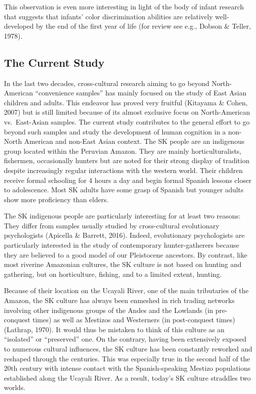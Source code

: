\documentclass[man]{apa6}
\theoremstyle{definition}
\theoremstyle{definition}
\theoremstyle{definition}
\theoremstyle{remark}
\begin{document}
This observation is even more interesting in light of the body of infant
research that suggests that infants' color discrimination abilities are
relatively well-developed by the end of the first year of life (for
review see e.g., Dobson \& Teller, 1978).

\subsection{The Current Study}\label{the-current-study}

In the last two decades, cross-cultural research aiming to go beyond
North-American \enquote{convenience samples} has mainly focused on the
study of East Asian children and adults. This endeavor has proved very
fruitful (Kitayama \& Cohen, 2007) but is still limited because of its
almost exclusive focus on North-American vs.~East-Asian samples. The
current study contributes to the general effort to go beyond such
samples and study the development of human cognition in a non-North
American and non-East Asian context. The SK people are an indigenous
group located within the Peruvian Amazon. They are mainly
horticulturalists, fishermen, occasionally hunters but are noted for
their strong display of tradition despite increasingly regular
interactions with the western world. Their children receive formal
schooling for 4 hours a day and begin formal Spanish lessons closer to
adolescence. Most SK adults have some grasp of Spanish but younger
adults show more proficiency than elders.

The SK indigenous people are particularly interesting for at least two
reasons: They differ from samples usually studied by cross-cultural
evolutionary psychologists (Apicella \& Barrett, 2016). Indeed,
evolutionary psychologists are particularly interested in the study of
contemporary hunter-gatherers because they are believed to a good model
of our Pleistocene ancestors. By contrast, like most riverine Amazonian
cultures, the SK culture is not based on hunting and gathering, but on
horticulture, fishing, and to a limited extent, hunting.

Because of their location on the Ucayali River, one of the main
tributaries of the Amazon, the SK culture has always been enmeshed in
rich trading networks involving other indigenous groups of the Andes and
the Lowlands (in pre-conquest times) as well as Mestizos and Westerners
(in post-conquest times) (Lathrap, 1970). It would thus be mistaken to
think of this culture as an \enquote{isolated} or \enquote{preserved}
one. On the contrary, having been extensively exposed to numerous
cultural influences, the SK culture has been constantly reworked and
reshaped through the centuries. This was especially true in the second
half of the 20th century with intense contact with the Spanish-speaking
Mestizo populations established along the Ucayali River. As a result,
today's SK culture straddles two worlds.
\end{document}
